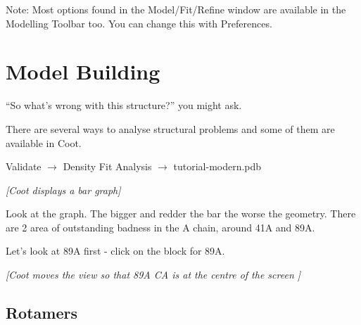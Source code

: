\documentclass{article}
\begin{document}
Note: Most options found in the Model/Fit/Refine window are available in
the Modelling Toolbar too. You can change this with Preferences.
  


\section{Model Building}

``So what's wrong with this structure?'' you might ask.

There are several ways to analyse structural problems and some of them
are available in Coot.

\begin{trivlist}
\item \textsf{Validate $\rightarrow$ Density Fit Analysis $\rightarrow$ tutorial-modern.pdb}

\textsl{ [Coot displays a bar graph]}

\item Look at the graph.  The bigger and redder the bar the worse the
  geometry. There are 2 area of outstanding badness in the A chain,
  around 41A and 89A.
\item Let's look at 89A first - click on the block for 89A.
\end{trivlist}

\textsl{ [Coot moves the view so that 89A CA is at the centre of the
  screen ]}

\subsection{Rotamers}
\end{document}

